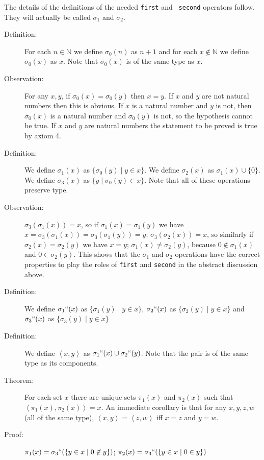 \documentclass[12pt]{book}
\begin{document}
The details of the definitions of the needed {\tt first} and {\tt
second} operators follow.  They will actually be called $\sigma_1$ and
$\sigma_2$.

\begin{description}

\item[Definition:] For each $n \in {\mathbb N}$ we define $\sigma_0(n)$
as $n+1$ and for each $x \not\in {\mathbb N}$ we define $\sigma_0(x)$ as
$x$.  Note that $\sigma_0(x)$ is of the same type as $x$.

\item[Observation:] For any $x,y$, if $\sigma_0(x)=\sigma_0(y)$ then
$x=y$.  If $x$ and $y$ are not natural numbers then this is obvious.
If $x$ is a natural number and $y$ is not, then $\sigma_0(x)$ is a
natural number and $\sigma_0(y)$ is not, so the hypothesis cannot be
true.  If $x$ and $y$ are natural numbers the statement to be proved
is true by axiom 4.

\item[Definition:] We define $\sigma_1(x)$ as $\{\sigma_0(y) \mid y \in
x\}$.  We define $\sigma_2(x)$ as $\sigma_1(x) \cup \{0\}$.  We define
$\sigma_3(x)$ as $\{y \mid \sigma_0(y) \in x\}$.  Note that all of these
operations preserve type.

\item[Observation:] $\sigma_3(\sigma_1(x)) = x$, so if $\sigma_1(x) =
\sigma_1(y)$ we have
$x=\sigma_3(\sigma_1(x))=\sigma_3(\sigma_1(y))=y$;
$\sigma_3(\sigma_2(x)) = x$, so similarly if $\sigma_2(x)=\sigma_2(y)$
we have $x=y$; $\sigma_1(x) \neq \sigma_2(y)$, because $0 \not\in
\sigma_1(x)$ and $0 \in \sigma_2(y)$.  This shows that the $\sigma_1$
and $\sigma_2$ operations have the correct properties to play the
roles of {\tt first} and {\tt second} in the abstract discussion
above.

\item[Definition:]  We define $\sigma_1``(x)$ as $\{\sigma_1(y)\mid y \in x\}$, $\sigma_2``(x)$ as $\{\sigma_2(y)\mid y \in x\}$ and  $\sigma_3``(x)$ as $\{\sigma_3(y)\mid y \in x\}$

\item[Definition:] We define $\left<x,y\right>$ as $\sigma_1``(x) \cup
\sigma_2``(y)$.  Note that the pair is of the same type as its
components.

\item[Theorem:] For each set $x$ there are unique sets $\pi_1(x)$ and
$\pi_2(x)$ such that $\left<\pi_1(x),\pi_2(x)\right>=x$.  An immediate
corollary is that for any $x,y,z,w$ (all of the same type),
$\left<x,y\right>=\left<z,w\right>$ iff $x=z$ and $y=w$.

\item[Proof:] $\pi_1(x) = \sigma_3``(\{y \in x \mid 0 \not\in y\})$;
$\pi_2(x) = \sigma_3``(\{y \in x \mid 0 \in y\})$

\end{description}
\end{document}
